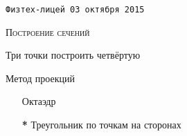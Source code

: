 \documentclass[a4paper, landscape, twocolumn, 11pt]{article}
\begin{document}
\begin{center}

\noindent\texttt{Физтех-лицей \hfill 03 октября 2015}

\vspace{-1ex}
\noindent\rule{0pt}{0pt}\hrulefill\rule{0pt}{0pt}

\bigskip

\textsc{\large Построение сечений}

\end{center}

Три точки построить четвёртую


Метод проекций

\begin{enumerate}[\bf 1.]

\item[\bf *] Октаэдр

\item[\bf **] Треугольник по точкам на сторонах



\end{enumerate}
\end{document}
